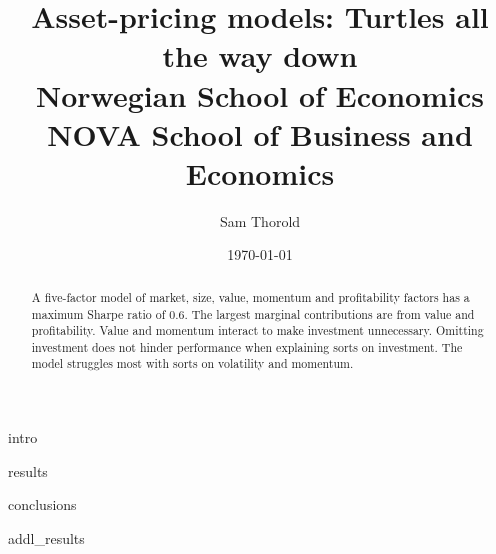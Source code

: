 \documentclass[a4paper, 12pt]{article}
\title{
  {Asset-pricing models: Turtles all the way down}\\
  {\large Norwegian School of Economics}\\
  {\large NOVA School of Business and Economics}
}
\author{Sam Thorold}
\date{\today}
\begin{document}
\maketitle

\begin{abstract}
  A five-factor model of
  market, size, value, momentum and profitability factors
  has a maximum Sharpe ratio of 0.6.
  The largest marginal contributions are from value and profitability.
  Value and momentum interact to make investment unnecessary.
  Omitting investment does not hinder performance when explaining sorts on investment.
  The model struggles most with sorts on volatility and momentum.
\end{abstract}

{intro}




{results}

{conclusions}

\printbibliography

\appendix

{addl_results}


\end{document}
